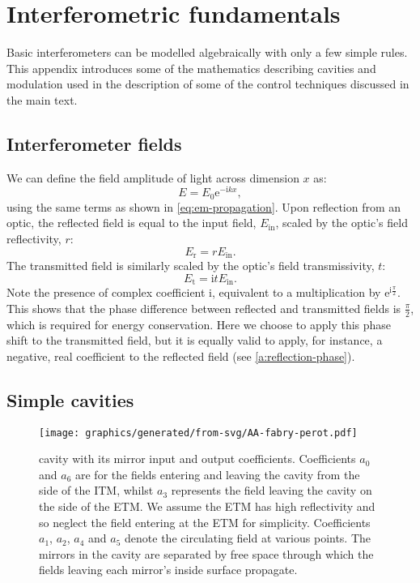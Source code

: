 \chapter{\label{a:interferometry}Interferometric fundamentals}
Basic interferometers can be modelled algebraically with only a few simple rules. This appendix introduces some of the mathematics describing \FP{} cavities and modulation used in the description of some of the control techniques discussed in the main text.

\section{Interferometer fields}
We can define the field amplitude of light across dimension $x$ as:
\begin{equation}
  \label{eq:field-amplitude}
  E = E_0 \text{e}^{-\text{i} kx},
\end{equation}
using the same terms as shown in \cref{eq:em-propagation}. Upon reflection from an optic, the reflected field is equal to the input field, $E_{\text{in}}$, scaled by the optic's field reflectivity, $r$:
\begin{equation}
  \label{eq:reflected-field}
  E_{\text{r}} = rE_{\text{in}}.
\end{equation}
The transmitted field is similarly scaled by the optic's field transmissivity, $t$:
\begin{equation}
  \label{eq:transmitted-field}
  E_{\text{t}} = \text{i}tE_{\text{in}}.
\end{equation}
Note the presence of complex coefficient $\text{i}$, equivalent to a multiplication by $\text{e}^{\text{i} \frac{\pi}{2}}$. This shows that the phase difference between reflected and transmitted fields is $\frac{\pi}{2}$, which is required for energy conservation. Here we choose to apply this phase shift to the transmitted field, but it is equally valid to apply, for instance, a negative, real coefficient to the reflected field (see \cref{a:reflection-phase}).

\section{\label{sec:simple-cavities}Simple cavities}

\begin{figure}
  \centering
  \texttt{[image: graphics/generated/from-svg/AA-fabry-perot.pdf]}
  \caption[\FP{} cavity with its mirror input and output coefficients]{\label{fig:fabry-perot}\FP{} cavity with its mirror input and output coefficients. Coefficients $a_0$ and $a_6$ are for the fields entering and leaving the cavity from the side of the \gls{ITM}, whilst $a_3$ represents the field leaving the cavity on the side of the \gls{ETM}. We assume the \gls{ETM} has high reflectivity and so neglect the field entering at the \gls{ETM} for simplicity. Coefficients $a_1$, $a_2$, $a_4$ and $a_5$ denote the circulating field at various points. The mirrors in the cavity are separated by free space through which the fields leaving each mirror's inside surface propagate.}
\end{figure}

